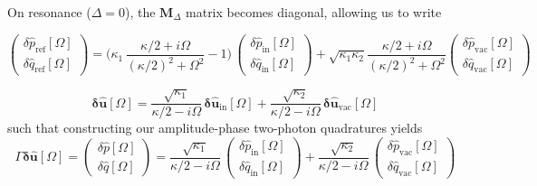  


On resonance ($\Delta=0$), the $\mathbf{M}_\Delta$ matrix becomes diagonal, allowing us to write 

\begin{equation}
  \begin{pmatrix}
  \delta \hat{p}_{\mathrm{ref}}[\Omega] \\[2pt]
\delta \hat{q}_{\mathrm{ref}}[\Omega]
\end{pmatrix}  = \Bigg(\kappa_1 \, \dfrac{\kappa/2+i\Omega}{\left(\kappa/2\right)^2+\Omega^2} - 1 \Bigg)  \,  \begin{pmatrix}
  \delta \hat{p}_{\mathrm{in}}[\Omega] \\[2pt]
\delta \hat{q}_{\mathrm{in}}[\Omega]
\end{pmatrix} +  \sqrt{\kappa_1 \kappa_2}  \dfrac{\kappa/2+i\Omega}{\left(\kappa/2\right)^2+\Omega^2}   \begin{pmatrix}
  \delta \hat{p}_{\mathrm{vac}}[\Omega] \\[2pt]
\delta \hat{q}_{\mathrm{vac}}[\Omega]
\end{pmatrix}
\end{equation}







\begin{equation} \mathbf{\delta \hat{u}}[\Omega]  = \frac{\sqrt{\kappa_1}}{\kappa/2 -i\Omega} \, \mathbf{\delta \hat{u}_{\mathrm{in}}}[\Omega]  + \frac{\sqrt{\kappa_2}}{\kappa/2 -i\Omega}  \, \mathbf{\delta \hat{u}_{\mathrm{vac}}}[\Omega] 
\end{equation}
such that constructing our amplitude-phase two-photon quadratures yields 
\begin{equation} \Gamma \mathbf{\delta \hat{u}}[\Omega]  = \begin{pmatrix}
  \delta \hat{p}[\Omega] \\[2pt]
\delta \hat{q}[\Omega]
\end{pmatrix} = \frac{\sqrt{\kappa_1}}{\kappa/2 -i\Omega} \, \begin{pmatrix}
  \delta \hat{p}_{\mathrm{in}}[\Omega] \\[2pt]
\delta \hat{q}_{\mathrm{in}}[\Omega]
\end{pmatrix}  + \frac{\sqrt{\kappa_2}}{\kappa/2 -i\Omega}  \, \begin{pmatrix}
  \delta \hat{p}_{\mathrm{vac}}[\Omega] \\[2pt]
\delta \hat{q}_{\mathrm{vac}}[\Omega]
\end{pmatrix}
\end{equation}

